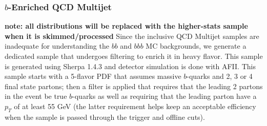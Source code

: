\subsubsection{$b$-Enriched QCD Multijet}
\label{sec:bb_qcd_mc}
\textbf{note: all distributions will be replaced with the higher-stats sample when
it is skimmed/processed}
Since the inclusive QCD Multijet samples are inadequate for understanding the $bb$ and 
$bbb$ MC backgrounds, we generate a dedicated sample that undergoes filtering to 
enrich it in heavy flavor.  This sample is generated using Sherpa 1.4.3 
\cite{Sherpa} and detector simulation is done with AFII.  This sample 
starts with a 5-flavor PDF that assumes massive $b$-quarks and 
2, 3 or 4 final state partons; then a filter is applied that 
requires that the leading 2 partons in the event be true $b$-quarks 
as well as requiring that the leading parton have a $p_T$ 
of at least 55 GeV (the latter requirement helps keep an acceptable efficiency when 
the sample is passed through the trigger and offline cuts).


